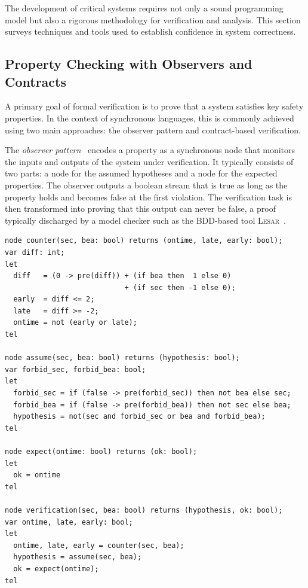The development of critical systems requires not only a sound programming model but also a rigorous
methodology for verification and analysis. This section surveys techniques and tools used to
establish confidence in system correctness.

\subsection{Property Checking with Observers and Contracts}
\label{sec:sota:verification:properties}

A primary goal of formal verification is to prove that a system satisfies key safety properties. In
the context of synchronous languages, this is commonly achieved using two main approaches: the
observer pattern and contract-based verification.

The \emph{observer pattern}~\cite{TR-2018-11} encodes a property as a synchronous node that monitors
the inputs and outputs of the system under verification. It typically consists of two parts: a node
for the assumed hypotheses and a node for the expected properties. The observer outputs a boolean
stream that is true as long as the property holds and becomes false at the first violation. The
verification task is then transformed into proving that this output can never be false, a proof
typically discharged by a model checker such as the BDD-based tool \textsc{Lesar}~\cite{DBLP:phd/hal/Ratel92}.

\begin{lstlisting}[basicstyle=\ttfamily\footnotesize\color{BlackText}]
node counter(sec, bea: bool) returns (ontime, late, early: bool);
var diff: int;
let
  diff   = (0 -> pre(diff)) + (if bea then  1 else 0)
                            + (if sec then -1 else 0);
  early  = diff <= 2;
  late   = diff >= -2;
  ontime = not (early or late);
tel

node assume(sec, bea: bool) returns (hypothesis: bool);
var forbid_sec, forbid_bea: bool;
let
  forbid_sec = if (false -> pre(forbid_sec)) then not bea else sec;
  forbid_bea = if (false -> pre(forbid_bea)) then not sec else bea;
  hypothesis = not(sec and forbid_sec or bea and forbid_bea);
tel

node expect(ontime: bool) returns (ok: bool);
let
  ok = ontime
tel

node verification(sec, bea: bool) returns (hypothesis, ok: bool);
var ontime, late, early: bool;
let
  ontime, late, early = counter(sec, bea);
  hypothesis = assume(sec, bea);
  ok = expect(ontime);
tel
\end{lstlisting}

